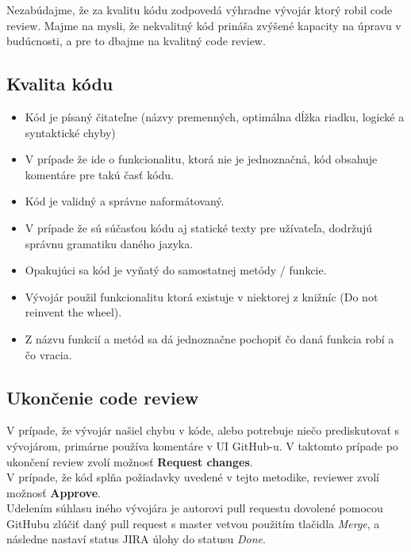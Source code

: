 \documentclass{article}
\begin{document}
    \noindent Nezabúdajme, že za kvalitu kódu zodpovedá výhradne vývojár ktorý robil code review. Majme na mysli, že nekvalitný kód
    prináša zvýšené kapacity na úpravu v budúcnosti, a pre to dbajme na kvalitný code review.

    \pagebreak

    \subsection*{Kvalita kódu}

    \begin{itemize}
        \item Kód je písaný čitateľne (názvy premenných, optimálna dĺžka riadku, logické a syntaktické chyby)
        \item V prípade že ide o funkcionalitu, ktorá nie je jednoznačná, kód obsahuje komentáre pre takú časť kódu.
        \item Kód je validný a správne naformátovaný.
        \item V prípade že sú súčasťou kódu aj statické texty pre užívateľa, dodržujú správnu gramatiku daného jazyka.
        \item Opakujúci sa kód je vyňatý do samostatnej metódy / funkcie.
        \item Vývojár použil funkcionalitu ktorá existuje v niektorej z knižníc (Do not reinvent the wheel).
        \item Z názvu funkcií a metód sa dá jednoznačne pochopiť čo daná funkcia robí a čo vracia.
    \end{itemize}

    \subsection*{Ukončenie code review}

    \noindent V prípade, že vývojár našiel chybu v kóde, alebo potrebuje niečo prediskutovať s vývojárom, primárne používa komentáre
    v UI GitHub-u. V taktomto prípade po ukončení review zvolí možnosť \textbf{Request changes}. \\

    \noindent V prípade, že kód splňa požiadavky uvedené v tejto metodike, reviewer zvolí možnosť \textbf{Approve}. \\

    \noindent Udelením súhlasu iného vývojára je autorovi pull requestu dovolené pomocou GitHubu zlúčiť daný pull request s master vetvou
    použitím tlačidla \emph{Merge}, a následne nastaví status JIRA úlohy do statusu \emph{Done}.
\end{document}
